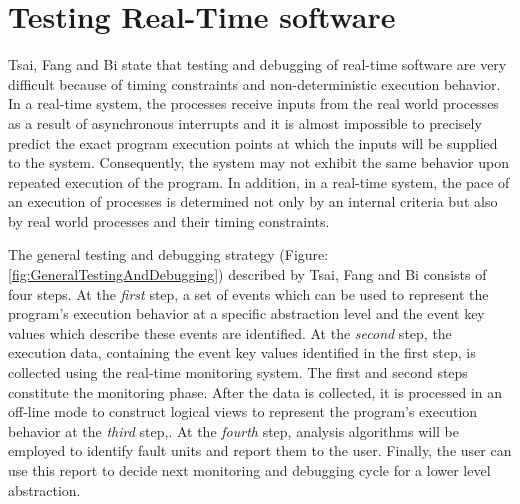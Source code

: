 

\section{Testing Real-Time software}
Tsai, Fang and Bi\cite{rtSandD} state that testing and debugging of real-time software are very difficult because of timing constraints and non-deterministic execution behavior. In a real-time system, the processes receive inputs from the real world processes as a result of asynchronous interrupts and it is almost impossible to precisely predict the exact program execution points at which the inputs will be supplied to the system. Consequently, the system may not exhibit the same behavior upon repeated execution of the program. In addition, in a real-time system, the pace of an execution of processes is determined not only by an internal criteria but also by real world processes and their timing constraints. 

The general testing and debugging strategy (Figure: \ref{fig:GeneralTestingAndDebugging}) described by Tsai, Fang and Bi \cite{rtSandD} consists of four steps.
At the \textit{first} step, a set of events which can be used to represent the program's execution behavior at a specific abstraction level and the event key values which describe these events are identified. 
At the \textit{second} step, the execution data, containing the event key values identified in the first step, is collected using the real-time monitoring system. 
The first and second steps constitute the monitoring phase. After the data is collected, it is processed in an off-line mode to construct logical views to represent the program's execution behavior at the \textit{third} step,.
At the \textit{fourth} step, analysis algorithms will be employed to identify fault units and report them to the user. 
Finally, the user can use this report to decide next monitoring and debugging cycle for a lower level abstraction.

